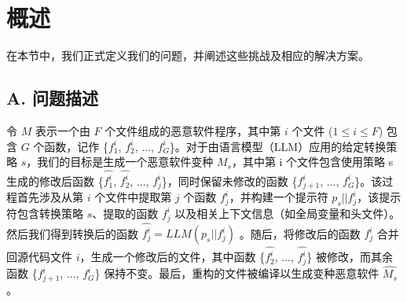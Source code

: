 \chapter{概述}
在本节中，我们正式定义我们的问题，并阐述这些挑战及相应的解决方案。

\section{A. 问题描述}
令 $M$ 表示一个由 $F$ 个文件组成的恶意软件程序，其中第 $i$ 个文件 ($1 ≤ i ≤ F$) 包含 $G$ 个函数，记作 \{$f_{1}^{i}$, $f_{2}^{i}$, ..., $f_{G}^{i}$\}。对于由语言模型（LLM）应用的给定转换策略 $s$，我们的目标是生成一个恶意软件变种 $M_{s}$，其中第 i 个文件包含使用策略 s 生成的修改后函数 \{$\hat{f_{1}^{i}}$, $\hat{f_{2}^{i}}$, ..., $\hat{f_{j}^{i}}$\}，同时保留未修改的函数 \{$f_{j+1}^{i}$, ..., $f_{G}^{i}$\}。该过程首先涉及从第 $i$ 个文件中提取第 $j$ 个函数 $f_{j}^{i}$，并构建一个提示符 $p_{s}||f_{j}^{i}$，该提示符包含转换策略 $s$、提取的函数 $f_{j}^{i}$ 以及相关上下文信息（如全局变量和头文件）。然后我们得到转换后的函数 $\hat{f_{j}^{i}} = LLM(p_{s}||f_{j}^{i})$ 。随后，将修改后的函数 $f_{j}^{i}$ 合并回源代码文件 $i$，生成一个修改后的文件，其中函数 \{$\hat{f_{2}^{i}}$, ..., $\hat{f_{j}^{i}}$\} 被修改，而其余函数 \{$f_{j+1}^{i}$, ..., $f_{G}^{i}$\} 保持不变。最后，重构的文件被编译以生成变种恶意软件 $\hat{M_{s}}$。

